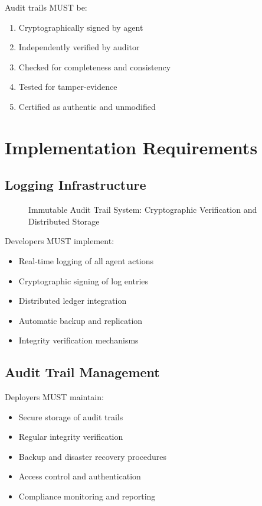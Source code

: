 \begin{articlebox}
Audit trails MUST be:
\begin{enumerate}
    \item Cryptographically signed by agent
    \item Independently verified by auditor
    \item Checked for completeness and consistency
    \item Tested for tamper-evidence
    \item Certified as authentic and unmodified
\end{enumerate}
\end{articlebox}

\vspace{0.5cm}

\section{Implementation Requirements}

\subsection{Logging Infrastructure}

\begin{figure}[h]
\centering

\caption{Immutable Audit Trail System: Cryptographic Verification and Distributed Storage}
\label{fig:audit-trail}
\end{figure}

Developers MUST implement:

\begin{itemize}
    \item Real-time logging of all agent actions
    \item Cryptographic signing of log entries
    \item Distributed ledger integration
    \item Automatic backup and replication
    \item Integrity verification mechanisms
\end{itemize}

\subsection{Audit Trail Management}

Deployers MUST maintain:

\begin{itemize}
    \item Secure storage of audit trails
    \item Regular integrity verification
    \item Backup and disaster recovery procedures
    \item Access control and authentication
    \item Compliance monitoring and reporting
\end{itemize}

